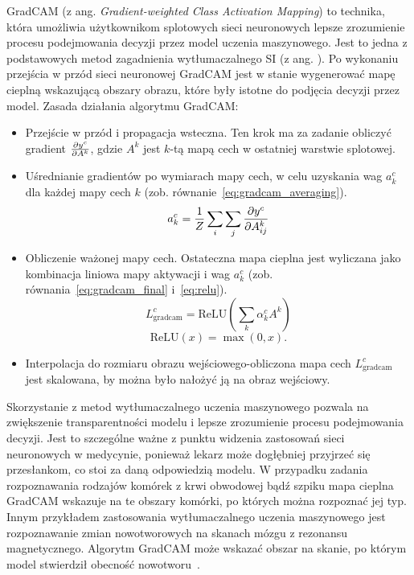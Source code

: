 GradCAM (z ang. \textit{Gradient-weighted Class Activation Mapping}) to technika, która umożliwia użytkownikom splotowych sieci neuronowych lepsze zrozumienie procesu podejmowania decyzji przez model uczenia maszynowego.
Jest to jedna z podstawowych metod zagadnienia wytłumaczalnego SI (z ang. ).
Po wykonaniu przejścia w przód sieci neuronowej GradCAM jest w stanie wygenerować mapę cieplną wskazującą obszary obrazu, które były istotne do podjęcia decyzji przez model.
Zasada działania algorytmu GradCAM:
\begin{itemize}
    \item Przejście w przód i propagacja wsteczna.
    Ten krok ma za zadanie obliczyć gradient $\frac{\partial{{y^c}}}{\partial{{A^k}}}$, gdzie $A^k$ jest $k$-tą mapą cech w ostatniej warstwie splotowej.
    \item Uśrednianie gradientów po wymiarach mapy cech, w celu uzyskania wag $a^c_k$ dla każdej mapy cech $k$ (zob.
    równanie~\ref{eq:gradcam_averaging}).
    \begin{equation}
        a^c_k = \frac{1}{Z} \sum_i \sum_j \frac{\partial{{y^c}}}{\partial{{A^k_{ij}}}}\label{eq:gradcam_averaging}
    \end{equation}
    \item Obliczenie ważonej mapy cech.
    Ostateczna mapa cieplna jest wyliczana jako kombinacja liniowa mapy aktywacji i wag $a^c_k$ (zob.
    równania~\ref{eq:gradcam_final} i~\ref{eq:relu}).
    \begin{equation}
        L^c_{\text{gradcam}} = \text{ReLU} \left( \sum_k \alpha^c_k A^k \right)\label{eq:gradcam_final}
    \end{equation}
    \begin{equation}
        \text{ReLU}(x) = \max(0, x).\label{eq:relu}
    \end{equation}
    \item Interpolacja do rozmiaru obrazu wejściowego-obliczona mapa cech $L^c_{\text{gradcam}}$ jest skalowana, by można było nałożyć ją na obraz wejściowy.
\end{itemize}

Skorzystanie z metod wytłumaczalnego uczenia maszynowego pozwala na zwiększenie transparentności modelu i lepsze zrozumienie procesu podejmowania decyzji.
Jest to szczególne ważne z punktu widzenia zastosowań sieci neuronowych w medycynie, ponieważ lekarz może dogłębniej przyjrzeć się przesłankom, co stoi za daną odpowiedzią modelu.
W przypadku zadania rozpoznawania rodzajów komórek z krwi obwodowej bądź szpiku mapa cieplna GradCAM wskazuje na te obszary komórki, po których można rozpoznać jej typ.
Innym przykładem zastosowania wytłumaczalnego uczenia maszynowego jest rozpoznawanie zmian nowotworowych na skanach mózgu z rezonansu magnetycznego.
Algorytm GradCAM może wskazać obszar na skanie, po którym model stwierdził obecność nowotworu~\cite{gradcam_brain_tumor}.

